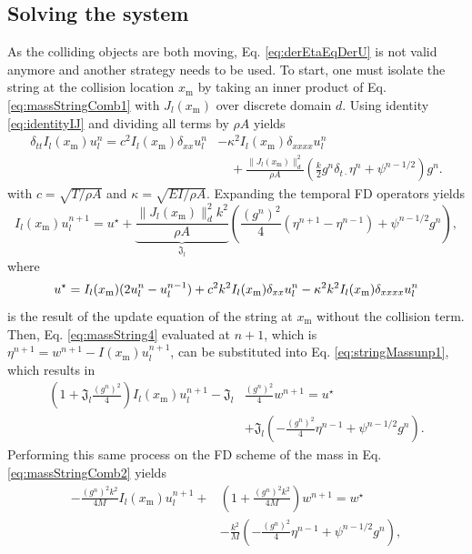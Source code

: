 \subsection{Solving the system}
As the colliding objects are both moving, Eq. \eqref{eq:derEtaEqDerU} is not valid anymore and another strategy needs to be used.
To start, one must isolate the string at the collision location $x_\text{m}$ by taking an inner product of Eq. \eqref{eq:massStringComb1} with $J_l(x_\text{m})$ over discrete domain $d$. Using identity \eqref{eq:identityIJ} and dividing all terms by $\rho A$ yields
\begin{align*}
    \delta_{tt}I_l(x_\text{m})u^n_l =c^2I_l(x_\text{m})\delta_{xx}u^n_l &- \kappa^2I_l(x_\text{m})\delta_{xxxx}u_l^n \\
    &\quad + \frac{\lVert J_l(x_\text{m})\rVert^2_d}{\rho A} \left(\frac{k}{2}g^n\delta_{t\cdot}\eta^n + \psi^{n-1/2}\right)g^n.
\end{align*}
with $c = \sqrt{T/\rho A}$ and $\kappa = \sqrt{EI/\rho A}$. Expanding the temporal FD operators yields 
\begin{equation}\label{eq:stringMassunp1}
    I_l(x_\text{m})u_l^{n+1} = u^\star+ \underbrace{\frac{\lVert J_l(x_\text{m})\rVert^2_d k^2}{\rho A}}_{\mathfrak{J}_l} \left(\frac{(g^n)^2}{4}\left(\eta^{n+1}-\eta^{n-1}\right) + \psi^{n-1/2}g^n\right),
\end{equation}
where 
\begin{equation*}
    u^\star = I_l(x_\text{m})(2u_l^n -u_l^{n-1}) + c^2k^2I_l(x_\text{m})\delta_{xx}u_l^n- \kappa^2k^2I_l(x_\text{m})\delta_{xxxx}u_l^n
\end{equation*}
is the result of the update equation of the string at $x_\text{m}$ without the collision term. Then, Eq. \eqref{eq:massString4} evaluated at $n+1$, which is $\eta^{n+1} = w^{n+1} - I(x_\text{m})u_l^{n+1}$, can be substituted into Eq. \eqref{eq:stringMassunp1}, which results in
\begin{equation}\label{eq:expandedMassString1}
    \begin{aligned}
    \left(1 + \mathfrak{J}_l\frac{(g^n)^2}{4}\right)I_l(x_\text{m})u_l^{n+1} - \mathfrak{J}_l&\frac{(g^n)^2}{4} w^{n+1}= u^\star\\
    & + \mathfrak{J}_l \left(-\frac{(g^n)^2}{4}\eta^{n-1} + \psi^{n-1/2}g^n\right).
    \end{aligned}
\end{equation}
Performing this same process on the FD scheme of the mass in Eq. \eqref{eq:massStringComb2} yields
\begin{equation}\label{eq:expandedMassString2}
    \begin{aligned}
    -\frac{(g^n)^2 k^2}{4M} I_l(x_\text{m})u_l^{n+1} + &\left(1 + \frac{(g^n)^2 k^2}{4M}\right)w^{n+1} = w^\star\\
    & - \frac{k^2}{M} \left(-\frac{(g^n)^2}{4}\eta^{n-1} + \psi^{n-1/2}g^n\right),
    \end{aligned}
\end{equation}
